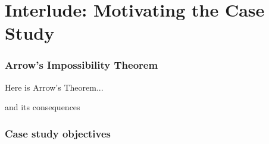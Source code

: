 \section{Interlude: Motivating the Case Study}

\begin{frame}
    \frametitle{Arrow's Impossibility Theorem}

    Here is Arrow's Theorem... 

    and its consequences
\end{frame}

\begin{frame}
    \frametitle{Case study objectives}
\end{frame}
